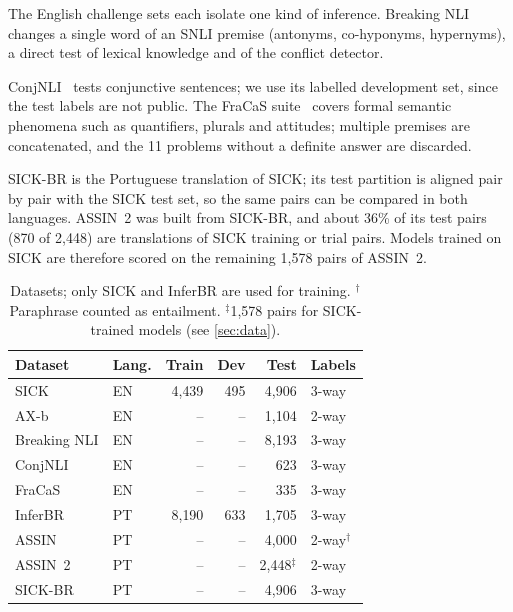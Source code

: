 The English challenge sets each isolate one kind of inference. Breaking NLI~\citep{glockner2018breaking}
changes a single word of an SNLI premise (antonyms, co-hyponyms, hypernyms), a direct test of lexical
knowledge and of the conflict detector.

ConjNLI~\citep{saha2020conjnli} tests conjunctive sentences; we use its labelled development set, since the
test labels are not public. The FraCaS suite~\citep{cooper1996fracas} covers formal semantic
phenomena such as quantifiers, plurals and attitudes; multiple premises are concatenated, and the 11
problems without a definite answer are discarded.

SICK-BR is the Portuguese translation of SICK; its test partition is aligned pair by pair with the SICK
test set, so the same pairs can be compared in both languages. ASSIN~2 was built from SICK-BR, and about
36\% of its test pairs (870 of 2{,}448) are translations of SICK training or trial pairs. Models trained on
SICK are therefore scored on the remaining 1{,}578 pairs of ASSIN~2.

\begin{table}[t]
  \centering\small
  \setlength{\tabcolsep}{4pt}
  \begin{tabular}{@{}l l r r r l@{}}
    \toprule
    Dataset & Lang. & Train & Dev & Test & Labels \\
    \midrule
    SICK         & EN & 4{,}439 & 495 & 4{,}906 & 3-way \\
    AX-b         & EN & -- & -- & 1{,}104 & 2-way \\
    Breaking NLI & EN & -- & -- & 8{,}193 & 3-way \\
    ConjNLI      & EN & -- & -- & 623 & 3-way \\
    FraCaS       & EN & -- & -- & 335 & 3-way \\
    \midrule
    InferBR      & PT & 8{,}190 & 633 & 1{,}705 & 3-way \\
    ASSIN        & PT & -- & -- & 4{,}000 & 2-way$^{\dagger}$ \\
    ASSIN~2      & PT & -- & -- & 2{,}448$^{\ddagger}$ & 2-way \\
    SICK-BR      & PT & -- & -- & 4{,}906 & 3-way \\
    \bottomrule
  \end{tabular}
  \caption{Datasets; only SICK and InferBR are used for training. $^{\dagger}$Paraphrase counted as
  entailment. $^{\ddagger}$1{,}578 pairs for SICK-trained models (see \cref{sec:data}).}
  \label{tab:data}
\end{table}

